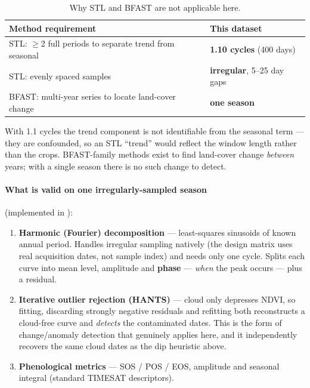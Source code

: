 \documentclass[11pt,a4paper]{article}
\newcommand{\file}[1]{\texttt{\detokenize{#1}}}
\begin{document}
\begin{table}[htbp]
\centering
\caption{Why STL and BFAST are not applicable here.}
\label{tab:decomp-req}
\begin{tabular}{ll}
\toprule
\textbf{Method requirement} & \textbf{This dataset} \\
\midrule
STL: $\geq$2 full periods to separate trend from seasonal & \textbf{1.10 cycles} (400 days) \\
STL: evenly spaced samples                                & \textbf{irregular}, 5--25 day gaps \\
BFAST: multi-year series to locate land-cover change      & \textbf{one season} \\
\bottomrule
\end{tabular}
\end{table}

With 1.1 cycles the trend component is not identifiable from the seasonal term
--- they are confounded, so an STL ``trend'' would reflect the window length
rather than the crops. BFAST-family methods exist to find land-cover change
\emph{between} years; with a single season there is no such change to detect.

\paragraph{What is valid on one irregularly-sampled season}
(implemented in \file{src/phenology.py}):
\begin{enumerate}[leftmargin=*]
  \item \textbf{Harmonic (Fourier) decomposition} --- least-squares sinusoids of
        known annual period. Handles irregular sampling natively (the design
        matrix uses real acquisition dates, not sample index) and needs only one
        cycle. Splits each curve into mean level, amplitude and \textbf{phase}
        --- \emph{when} the peak occurs --- plus a residual.
  \item \textbf{Iterative outlier rejection (HANTS)} --- cloud only depresses
        NDVI, so fitting, discarding strongly negative residuals and refitting
        both reconstructs a cloud-free curve and \emph{detects} the contaminated
        dates. This is the form of change/anomaly detection that genuinely
        applies here, and it independently recovers the same cloud dates as the
        dip heuristic above.
  \item \textbf{Phenological metrics} --- SOS / POS / EOS, amplitude and
        seasonal integral (standard TIMESAT descriptors).
\end{enumerate}
\end{document}
